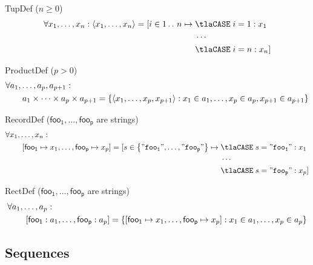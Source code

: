 \documentclass[11pt, a4paper, oneside]{article}
\begin{document}
\begin{axioms}
\item[TupDef ($n \ge 0$)] \[
        \forall x_1, \dots, x_n : \tup{ x_1, \dots, x_n } = [ i \in 1 \ltwodots n \mapsto \begin{aligned}[t]
            &\tlaCASE\; i = 1 : x_1 \\
            & \cdots \\
            &\tlaCASE\; i = n : x_n ]
        \end{aligned}
    \]

\item[ProductDef ($p > 0$)] \[
        \begin{aligned}
            &\forall a_1, \dots, a_p, a_{p + 1} : \\
            &\qquad a_1 \times \cdots \times a_p \times a_{p + 1} = \left\{  \left\langle  x_1, \dots, x_p, x_{p + 1}  \right\rangle : x_1 \in a_1, \dots, x_p \in a_p, x_{p + 1} \in a_{p + 1}  \right\}
        \end{aligned}
    \]

\item[RecordDef (\rm$\mathsf{foo_1},\dots,\mathsf{foo_p}$ are strings)] \[
        \begin{aligned}
            &\forall x_1, \dots, x_n : \\
            &\qquad \bx{ \mathsf{foo_1} \mapsto x_1, \dots, \mathsf{foo_p} \mapsto x_p } = [ s \in \st{ \mkstr{foo_1}, \dots, \mkstr{foo_p} } \mapsto \begin{aligned}[t]
                &\tlaCASE\; s = \mkstr{foo_1} : x_1 \\
                & \cdots \\
                &\tlaCASE\; s = \mkstr{foo_p} : x_p ]
            \end{aligned}
        \end{aligned}
    \]

\item[RectDef (\rm$\mathsf{foo_1},\dots,\mathsf{foo_p}$ are strings)] \[
        \begin{aligned}
            &\forall a_1, \dots, a_p : \\
            &\qquad \left[  \mathsf{foo_1} : a_1, \dots, \mathsf{foo_p} : a_p  \right] = \left\{  \left[  \mathsf{foo_1} \mapsto x_1, \dots, \mathsf{foo_p} \mapsto x_p  \right] : x_1 \in a_1, \dots, x_p \in a_p  \right\}
        \end{aligned}
    \]

\end{axioms}


    \subsection{Sequences}
    \label{subsec:seqs}
\end{document}
